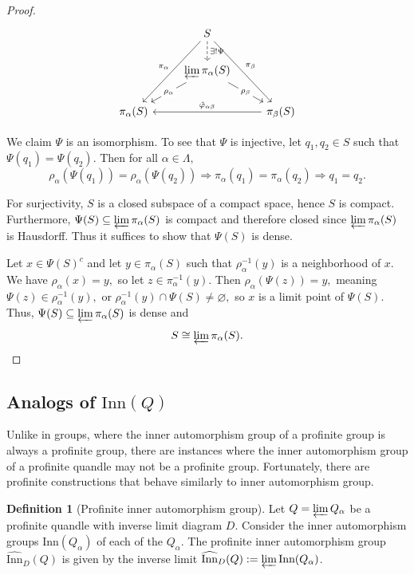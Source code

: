 \documentclass[reqno,dvipsnames]{amsart}
\renewcommand{\a}{\alpha}
\newcommand{\Inn}{\text{Inn}}
\theoremstyle{definition}
\newtheorem{definition}[theorem]{Definition}
\begin{document}
{\begin{proof}
\[\begin{tikzcd}
	& {S} \\
	& {\varprojlim \pi_\alpha(S)} \\
	{\pi_\alpha(S)} && {\pi_\beta(S)}
	\arrow["{\rho_\beta}"{description}, from=2-2, to=3-3]
	\arrow["{\rho_\alpha}"{description}, from=2-2, to=3-1]
	\arrow["{\hat\varphi_{\alpha\beta}}"', from=3-3, to=3-1]
	\arrow["{\pi_\beta}", from=1-2, to=3-3]
	\arrow["{\pi_\alpha}"', from=1-2, to=3-1]
	\arrow["{\exists!\Psi}", dashed, from=1-2, to=2-2]
\end{tikzcd}\]

We claim $\Psi$ is an isomorphism. To see that $\Psi$ is injective, let $q_1,q_2 \in S$ such that $\Psi(q_1) = \Psi(q_2).$ Then for all $\alpha \in \Lambda,$
\[\rho_\alpha(\Psi(q_1)) = \rho_\alpha(\Psi(q_2)) \Rightarrow \pi_\alpha(q_1) = \pi_\alpha(q_2) \Rightarrow q_1 = q_2.\]

For surjectivity, $S$ is a closed subspace of a compact space, hence $S$ is compact. Furthermore, $\Psi(S) \subseteq \varprojlim \pi_\alpha(S)$ is compact and therefore closed since $\varprojlim \pi_\alpha(S)$ is Hausdorff. Thus it suffices to show that $\Psi(S)$ is dense.

Let $x \in \Psi(S)^c$ and let $y \in \pi_\alpha(S)$ such that $\rho_\alpha^{-1}(y)$ is a neighborhood of $x$. We have $\rho_\alpha(x) = y,$ so let $z \in \pi_\alpha^{-1}(y).$ Then $\rho_\alpha(\Psi(z)) = y,$ meaning $\Psi(z) \in \rho_\alpha^{-1}(y),$ or $\rho_\alpha^{-1}(y) \cap \Psi(S) \neq \varnothing,$ so $x$ is a limit point of $\Psi(S)$. Thus, $\Psi(S) \subseteq \varprojlim \pi_\alpha(S)$ is dense and 
\[S \cong \varprojlim \pi_\alpha(S).\]

\end{proof}

\subsection{Analogs of $\Inn(Q)$} Unlike in groups, where the inner automorphism group of a profinite group is always a profinite group, there are instances where the inner automorphism group of a profinite quandle may not be a profinite group. Fortunately, there are profinite constructions that behave similarly to inner automorphism group.

\begin{definition}[Profinite inner automorphism group]
Let $Q=\varprojlim Q_\a$ be a profinite quandle with inverse limit diagram $D$. Consider the inner automorphism groups $\Inn(Q_\a)$ of each of the $Q_\a$. The profinite inner automorphism group $\widehat{\Inn}_D(Q)$ is given by the inverse limit $\widehat{\Inn}_D(Q):=\varprojlim\Inn(Q_\a)$.
\end{definition}

}
\end{document}
